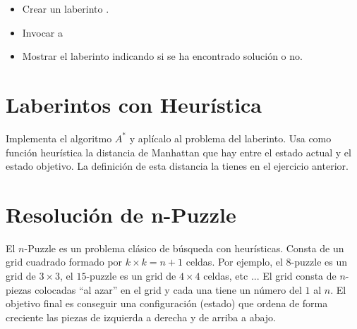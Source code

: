 \begin{enumerate}
\begin{itemize}
\item Crear un laberinto .
\item Invocar a 
\item Mostrar el laberinto indicando si se ha encontrado solución o no.
\end{itemize}

\end{enumerate}


%





\separacion
\section{Laberintos con Heurística} \label{ejer:Astar}

Implementa el algoritmo $A^*$ y aplícalo al problema del laberinto.
Usa como función heurística la distancia de Manhattan que hay entre el estado actual y el estado objetivo. La definición de esta distancia la tienes en el ejercicio anterior.



%






\separacion
\section{Resolución de n-Puzzle} 

El $n$-Puzzle es un problema clásico de búsqueda con heurísticas.
Consta de un grid cuadrado formado por $k\times k=n+1$ celdas.
Por ejemplo, el $8$-puzzle es un grid de $3\times 3$, el $15$-puzzle es un grid de $4\times 4$ celdas, etc ... El grid consta de $n$-piezas colocadas ``al azar'' en el grid y cada una tiene un número del $1$ al $n$. El objetivo final es conseguir una configuración (estado) que ordena de forma creciente las piezas de izquierda a derecha y de arriba a abajo.

